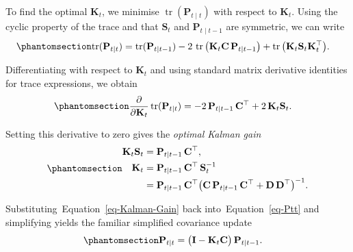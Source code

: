 \documentclass[
  letterpaper,
  DIV=11,
  numbers=noendperiod]{scrreprt}
\begin{document}
To find the optimal \(\mathbf{K}_t\), we minimise
\(\operatorname{tr}(\mathbf{P}_{t\mid t})\) with respect to
\(\mathbf{K}_t\). Using the cyclic property of the trace and that
\(\mathbf{S}_t\) and \(\mathbf{P}_{t\mid t-1}\) are symmetric, we can
write \begin{equation}\protect\phantomsection\label{eq-gen-0122}{
\begin{align}
  \operatorname{tr}(\mathbf{P}_{t\mid t})
    &= \operatorname{tr}(\mathbf{P}_{t\mid t-1})
       - 2\,\operatorname{tr}\big(\mathbf{K}_t \mathbf{C}\,\mathbf{P}_{t\mid t-1}\big)
       + \operatorname{tr}\big(\mathbf{K}_t \mathbf{S}_t \mathbf{K}_t^\top\big).
\end{align}
}\end{equation}

Differentiating with respect to \(\mathbf{K}_t\) and using standard
matrix derivative identities for trace expressions, we obtain
\begin{equation}\protect\phantomsection\label{eq-gen-0123}{
\begin{align}
  \frac{\partial}{\partial \mathbf{K}_t}
  \operatorname{tr}(\mathbf{P}_{t\mid t})
    &= -2\,\mathbf{P}_{t\mid t-1}\,\mathbf{C}^\top
       + 2\,\mathbf{K}_t \mathbf{S}_t.
\end{align}
}\end{equation}

Setting this derivative to zero gives the \emph{optimal Kalman gain}
\begin{equation}\protect\phantomsection\label{eq-Kalman-Gain}{
\begin{align}
  \mathbf{K}_t \mathbf{S}_t
    &= \mathbf{P}_{t\mid t-1}\,\mathbf{C}^\top, \\
  \mathbf{K}_t
    &= \mathbf{P}_{t\mid t-1}\,\mathbf{C}^\top\,\mathbf{S}_t^{-1} \\
    &= \mathbf{P}_{t\mid t-1}\,\mathbf{C}^\top
       \big(\mathbf{C}\,\mathbf{P}_{t\mid t-1}\,\mathbf{C}^\top
           + \mathbf{D}\,\mathbf{D}^\top\big)^{-1}.
\end{align}
}\end{equation}

Substituting~Equation~\ref{eq-Kalman-Gain} back
into~Equation~\ref{eq-Ptt} and simplifying yields the familiar
simplified covariance update
\begin{equation}\protect\phantomsection\label{eq-gen-0125}{
\begin{align}
  \mathbf{P}_{t\mid t}
    &= \big(\mathbf{I} - \mathbf{K}_t \mathbf{C}\big)\,\mathbf{P}_{t\mid t-1}.
\end{align}
}\end{equation}
\end{document}
